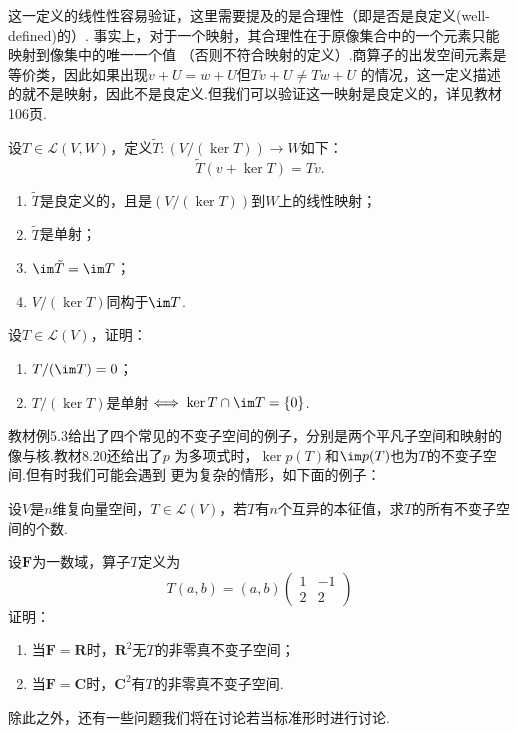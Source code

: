 这一定义的线性性容易验证，这里需要提及的是合理性（即是否是良定义(well-defined)的）.
事实上，对于一个映射，其合理性在于原像集合中的一个元素只能映射到像集中的唯一一个值
（否则不符合映射的定义）.商算子的出发空间元素是等价类，因此如果出现$v+U=w+U$但$Tv+U\neq Tw+U$
的情况，这一定义描述的就不是映射，因此不是良定义.但我们可以验证这一映射是良定义的，详见教材106页.
\begin{example}
    设$T\in \mathcal{L}(V,W)$，定义$\tilde{T}:(V/(\ker T))\to W$如下：
    \[\tilde{T}(v+\ker T)=Tv.\]
    \begin{enumerate}
        \item $\tilde{T}$是良定义的，且是$(V/(\ker T))$到$W$上的线性映射；

        \item $\tilde{T}$是单射；

        \item $\im \tilde{T}=\im T$；

        \item $V/(\ker T)$同构于$\im T$.
    \end{enumerate}
\end{example}
\begin{example}
    设$T\in \mathcal{L}(V)$，证明：
    \begin{enumerate}
        \item $T/(\im T)=0$；

        \item $T/(\ker T)$是单射$\iff \ker T\cap\im T=\{0\}$.
    \end{enumerate}
\end{example}
教材例5.3给出了四个常见的不变子空间的例子，分别是两个平凡子空间和映射的像与核.教材8.20还给出了$p$
为多项式时，$\ker p(T)$和$\im p(T)$也为$T$的不变子空间.但有时我们可能会遇到
更为复杂的情形，如下面的例子：
\begin{example}
    设$V$是$n$维复向量空间，$T\in \mathcal{L}(V)$，若$T$有$n$个互异的本征值，求$T$的所有不变子空间的个数.
\end{example}
\begin{example}
    设$\mathbf{F}$为一数域，算子$T$定义为
    \[T(a,b)=(a,b)\begin{pmatrix}
        1 & -1 \\ 2 & 2
    \end{pmatrix}\]
    证明：
    \begin{enumerate}
        \item 当$\mathbf{F}=\mathbf{R}$时，$\mathbf{R}^2$无$T$的非零真不变子空间；

        \item 当$\mathbf{F}=\mathbf{C}$时，$\mathbf{C}^2$有$T$的非零真不变子空间.
    \end{enumerate}
\end{example}
除此之外，还有一些问题我们将在讨论若当标准形时进行讨论.

